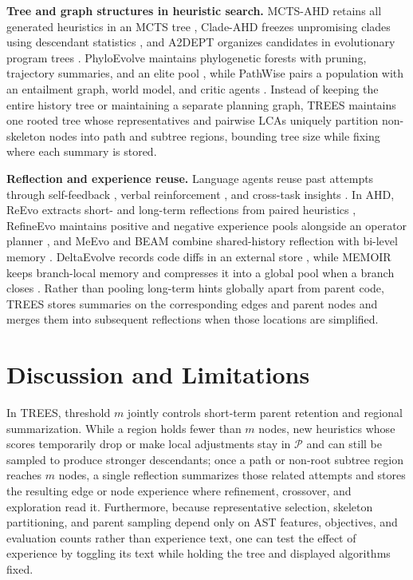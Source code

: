 \documentclass{article}
\begin{document}
\textbf{Tree and graph structures in heuristic search.} MCTS-AHD retains all generated heuristics in an MCTS tree \citep{uct, mctsahd}, Clade-AHD freezes unpromising clades using descendant statistics \citep{cladeahd}, and A2DEPT organizes candidates in evolutionary program trees \citep{a2dept}. PhyloEvolve maintains phylogenetic forests with pruning, trajectory summaries, and an elite pool \citep{phyloevolve}, while PathWise pairs a population with an entailment graph, world model, and critic agents \citep{pathwise}. Instead of keeping the entire history tree or maintaining a separate planning graph, TREES maintains one rooted tree whose representatives and pairwise LCAs uniquely partition non-skeleton nodes into path and subtree regions, bounding tree size while fixing where each summary is stored.

\textbf{Reflection and experience reuse.} Language agents reuse past attempts through self-feedback \citep{selfrefine}, verbal reinforcement \citep{reflexion}, and cross-task insights \citep{expel}. In AHD, ReEvo extracts short- and long-term reflections from paired heuristics \citep{reevo}, RefineEvo maintains positive and negative experience pools alongside an operator planner \citep{refineevo}, and MeEvo and BEAM combine shared-history reflection with bi-level memory \citep{meevo, beam}. DeltaEvolve records code diffs in an external store \citep{deltaevolve}, while MEMOIR keeps branch-local memory and compresses it into a global pool when a branch closes \citep{memorytree}. Rather than pooling long-term hints globally apart from parent code, TREES stores summaries on the corresponding edges and parent nodes and merges them into subsequent reflections when those locations are simplified.

\section{Discussion and Limitations}\label{discussion-and-limitations}

In TREES, threshold \(m\) jointly controls short-term parent retention and regional summarization. While a region holds fewer than \(m\) nodes, new heuristics whose scores temporarily drop or make local adjustments stay in \(\mathcal P\) and can still be sampled to produce stronger descendants; once a path or non-root subtree region reaches \(m\) nodes, a single reflection summarizes those related attempts and stores the resulting edge or node experience where refinement, crossover, and exploration read it. Furthermore, because representative selection, skeleton partitioning, and parent sampling depend only on AST features, objectives, and evaluation counts rather than experience text, one can test the effect of experience by toggling its text while holding the tree and displayed algorithms fixed.
\end{document}
